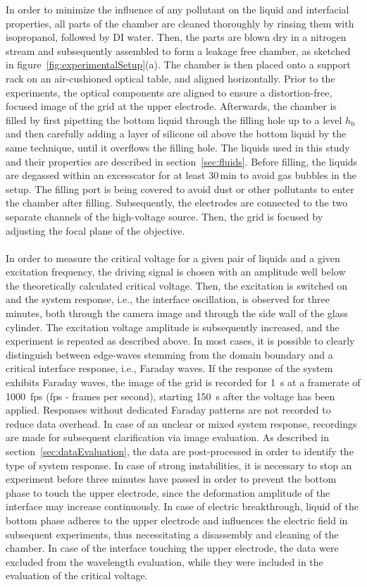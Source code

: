 \documentclass{jfm_arxiv}
\begin{document}
In order to minimize the influence of any pollutant on the liquid and interfacial properties, all parts of the chamber are cleaned thoroughly by rinsing them with isopropanol, followed by DI water.
Then, the parts are blown dry in a nitrogen stream and subsequently assembled to form a leakage free chamber, as sketched in figure~\ref{fig:experimentalSetup}(a).
The chamber is then placed onto a support rack on an air-cushioned optical table, and aligned horizontally.
Prior to the experiments, the optical components are aligned to ensure a distortion-free, focused image of the grid at the upper electrode.
Afterwards, the chamber is filled by first pipetting the bottom liquid through the filling hole up to a level $h_\mathrm{b}$ and then carefully adding a layer of silicone oil above the bottom liquid by the same technique, until it overflows the filling hole.
The liquids used in this study and their properties are described in section~\ref{sec:fluids}.
Before filling, the liquids are degassed within an excesscator for at least 30\,min to avoid gas bubbles in the setup.
The filling port is being covered to avoid dust or other pollutants to enter the chamber after filling.
Subsequently, the electrodes are connected to the two separate channels of the high-voltage source.
Then, the grid is focused by adjusting the focal plane of the objective.\\
\\
In order to measure the critical voltage for a given pair of liquids and a given excitation frequency, the driving signal is chosen with an amplitude well below the theoretically calculated critical voltage.
Then, the excitation is switched on and the system response, i.e., the interface oscillation, is observed for three minutes, both through the camera image and through the side wall of the glass cylinder.
The excitation voltage amplitude is subsequently increased, and the experiment is repeated as described above.
In most cases, it is possible to clearly distinguish between edge-waves stemming from the domain boundary and a critical interface response, i.e., Faraday waves.
If the response of the system exhibits Faraday waves, the image of the grid is recorded for \SI{1}{\second} at a framerate of \SI{1000}{fps} (fps - frames per second), starting \SI{150}{\second} after the voltage has been applied.
Responses without dedicated Faraday patterns are not recorded to reduce data overhead.
In case of an unclear or mixed system response, recordings are made for subsequent clarification via image evaluation.
As described in section~\ref{sec:dataEvaluation}, the data are post-processed in order to identify the type of system response.
In case of strong instabilities, it is necessary to stop an experiment before three minutes have passed in order to prevent the bottom phase to touch the upper electrode, since the deformation amplitude of the interface may increase continuously.
In case of electric breakthrough, liquid of the bottom phase adheres to the upper electrode and influences the electric field in subsequent experiments, thus necessitating a disassembly and cleaning of the chamber.
In case of the interface touching the upper electrode, the data were excluded from the wavelength evaluation, while they were included in the evaluation of the critical voltage.
\end{document}
